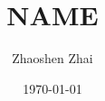 \documentclass[reqno]{amsart}
\begin{document}
    \title{NAME}
    \author{Zhaoshen Zhai}
    \date{\today}
    \maketitle
\end{document}

